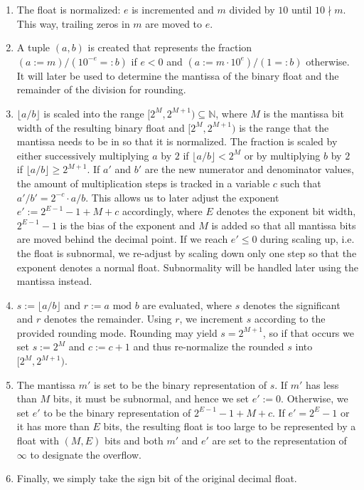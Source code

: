 \documentclass[a4paper,UKenglish,cleveref, autoref, thm-restate]{lipics-v2019}
\begin{document}
\begin{enumerate}
	\item The float is normalized: $e$ is incremented and $m$ divided by $10$ until $10 \nmid m$. This way, trailing zeros in $m$ are moved to $e$.
	\item A tuple $(a, b)$ is created that represents the fraction $(a := m) / (10^{-e} =: b)$ if $e < 0$ and $(a := m \cdot 10^e) / (1 =: b)$ otherwise. It will later be used to determine the mantissa of the binary float and the remainder of the division for rounding.
	\item $\lfloor a / b \rfloor$ is scaled into the range $[2^M, 2^{M+1}) \subseteq \mathbb{N}$, where $M$ is the mantissa bit width of the resulting binary float and $[2^M, 2^{M+1})$ is the range that the mantissa needs to be in so that it is normalized. The fraction is scaled by either successively multiplying $a$ by $2$ if $\lfloor a / b \rfloor < 2^M$ or by multiplying $b$ by $2$ if $\lfloor a / b \rfloor \geq 2^{M+1}$. If $a'$ and $b'$ are the new numerator and denominator values, the amount of multiplication steps is tracked in a variable $c$ such that $a' / b' = 2^{-c} \cdot a / b$. This allows us to later adjust the exponent $e' := 2^{E-1}-1 + M + c$ accordingly, where $E$ denotes the exponent bit width, $2^{E-1}-1$ is the bias of the exponent and $M$ is added so that all mantissa bits are moved behind the decimal point. If we reach $e' \leq 0$ during scaling up, i.e. the float is subnormal, we re-adjust by scaling down only one step so that the exponent denotes a normal float. Subnormality will be handled later using the mantissa instead.
	\item $s := \lfloor a / b \rfloor$ and $r := a \text{ mod } b$ are evaluated, where $s$ denotes the significant and $r$ denotes the remainder. Using $r$, we increment $s$ according to the provided rounding mode. Rounding may yield $s = 2^{M+1}$, so if that occurs we set $s := 2^M$ and $c := c + 1$ and thus re-normalize the rounded $s$ into $[2^M, 2^{M+1})$.
	\item The mantissa $m'$ is set to be the binary representation of $s$. If $m'$ has less than $M$ bits, it must be subnormal, and hence we set $e' := 0$. Otherwise, we set $e'$ to be the binary representation of $2^{E-1}-1 + M + c$. If $e' = 2^E - 1$ or it has more than $E$ bits, the resulting float is too large to be represented by a float with $(M, E)$ bits and both $m'$ and $e'$ are set to the representation of $\infty$ to designate the overflow.
	\item Finally, we simply take the sign bit of the original decimal float.
\end{enumerate}
\end{document}
